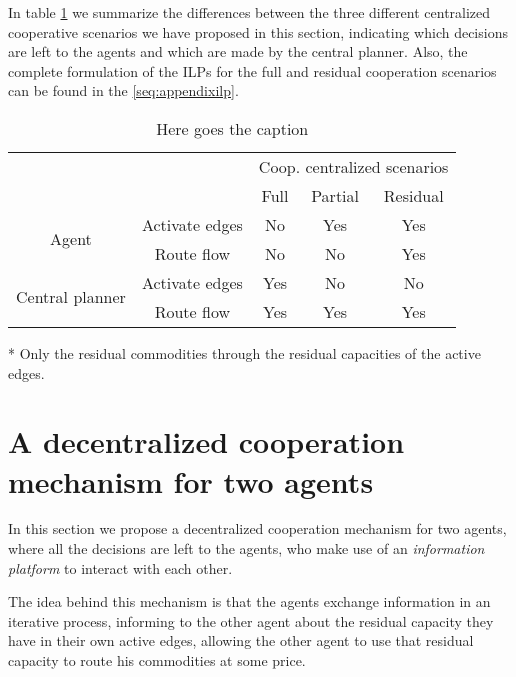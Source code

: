 \documentclass[review]{elsarticle}
\begin{document}
In table \ref{tb:summarycentralizedmodels} we summarize the differences between the three different centralized cooperative scenarios we have proposed in this section, indicating which decisions are left to the agents and which are made by the central planner. Also, the complete formulation of the ILPs for the full and residual cooperation scenarios can be found in the \ref{seq:appendixilp}.

\begin{table}[ht!]
	\centering
	\caption{Here goes the caption \label{tb:summarycentralizedmodels}}
    \begin{threeparttable}
        \begin{tabular}{ccccc}
            & &      \multicolumn{3}{c}{Coop. centralized scenarios} \\\cline{3-5}
            & & Full & Partial & Residual \\ \hline
            \multirow{2}{*}{Agent} & Activate edges & No & Yes & Yes \\
            & Route flow     & No & No & Yes \\\hline
            \multirow{2}{*}{Central planner} & Activate edges & Yes & No & No \\
            & Route flow & Yes & Yes & Yes\tnote{*} \\\hline\hline
        \end{tabular}
    \begin{tablenotes}\footnotesize
        \item[*] Only the residual commodities through the residual capacities
        of the active edges.
        \end{tablenotes}
    \end{threeparttable}
    \end {table}

\section{A decentralized cooperation mechanism for two agents} \label{seq:itermodel}

In this section we propose a decentralized cooperation mechanism for two agents, where all the decisions are left to the agents, who make use of an \emph{information platform} to interact with each other.

The idea behind this mechanism is that the agents exchange information in an iterative process, informing to the other agent about the residual capacity they have in their own active edges, allowing the other agent to use that residual capacity to route his commodities at some price.
\end{document}
